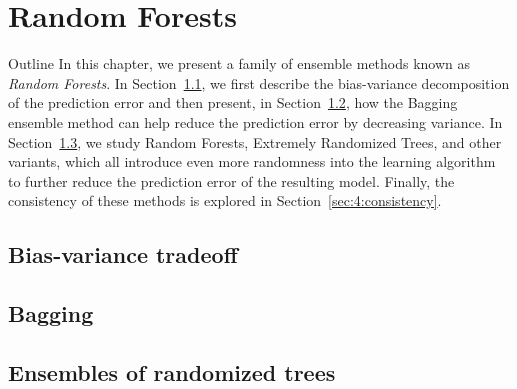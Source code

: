 \chapter{Random Forests}\label{ch:forest}

\begin{remark}{Outline}
In this chapter, we present a family of ensemble methods known as \textit{Random
Forests}. In Section~\ref{sec:4:bias-variance}, we first describe the
bias-variance decomposition of the prediction error and then present, in
Section~\ref{sec:4:bagging}, how the Bagging ensemble method can help reduce
the prediction error by decreasing variance. In Section~\ref{sec:4:ensemble},
we study Random Forests, Extremely Randomized Trees, and other variants, which
all introduce even more randomness into the learning algorithm to further
reduce the prediction error of the resulting model. Finally, the consistency of
these methods is explored in Section~\ref{sec:4:consistency}.
\end{remark}

\section{Bias-variance tradeoff}
\label{sec:4:bias-variance}


\section{Bagging}
\label{sec:4:bagging}




\section{Ensembles of randomized trees}
\label{sec:4:ensemble}

